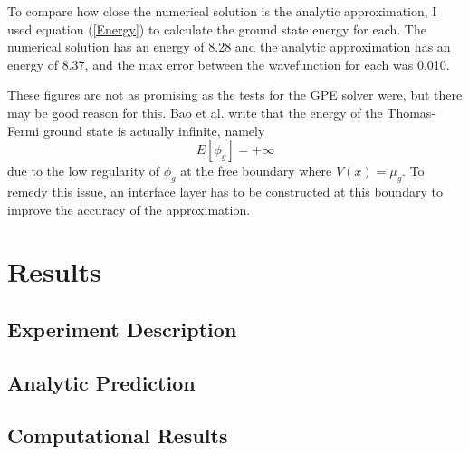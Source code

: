 \documentclass[12]{article}
\begin{document}
To compare how close the numerical solution is the analytic approximation, I used equation (\ref{Energy}) to calculate the ground state energy for each. The numerical solution has an energy of 8.28 and the analytic approximation has an energy of 8.37, and the max error between the wavefunction for each was 0.010. 

These figures are not as promising as the tests for the GPE solver were, but there may be good reason for this. Bao et al. \cite{bao2003ground} write that the energy of the Thomas-Fermi ground state is actually infinite, namely
\begin{equation}
E[\phi_g] = +\infty
\end{equation}
due to the low regularity of $\phi_g$ at the free boundary where $V(x) = \mu_g$. To remedy this issue, an interface layer has to be constructed at this boundary to improve the accuracy of the approximation.

\section{Results}

\subsection{Experiment Description}

\subsection{Analytic Prediction}

\subsection{Computational Results}



\end{document}

